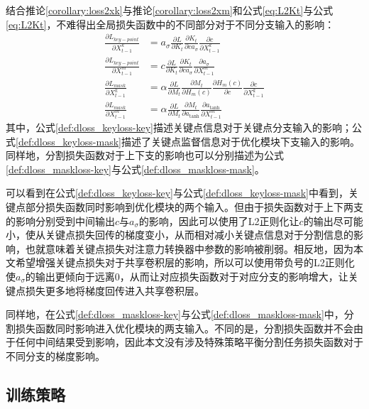 结合推论\ref{corollary:loss2xk}与推论\ref{corollary:loss2xm}和公式\eqref{eq:L2Kt}与公式\eqref{eq:L2Kt}，不难得出全局损失函数中的不同部分对于不同分支输入的影响：
\begin{align}
\frac{\partial L_{key-point}}{\partial X^k_{t-1}} &= a_{\sigma}\frac{\partial L}{\partial K_t}\frac{\partial K_t}{\partial ca_{\sigma}}\frac{\partial c}{\partial X_{t-1}^k}\label{def:dloss_keyloss-key}\\
\frac{\partial L_{key-point}}{\partial X^m_{t-1}} &= c\frac{\partial L}{\partial K_t}\frac{\partial K_t}{\partial ca_{\sigma}}\frac{\partial a_{\sigma}}{\partial X^m_{t-1}}\label{def:dloss_keyloss-mask}\\
\frac{\partial L_{mask}}{\partial X^k_{t-1}} &= \alpha\frac{\partial L}{\partial M_t}\frac{\partial M_t}{\partial H_m(c)}\frac{\partial H_m(c)}{\partial c}\frac{\partial c}{\partial X_{t-1}^k}\label{def:dloss_maskloss-key}\\
\frac{\partial L_{mask}}{\partial X^m_{t-1}} &= \alpha\frac{\partial L}{\partial M_t}\frac{\partial M_t}{\partial a_{\tanh}}\frac{\partial a_{\tanh}}{\partial X^m_{t-1}}\label{def:dloss_maskloss-mask}
\end{align}
其中，公式\eqref{def:dloss_keyloss-key}描述关键点信息对于关键点分支输入的影响；公式\eqref{def:dloss_keyloss-mask}描述了关键点监督信息对于优化模块下支输入的影响。同样地，分割损失函数对于上下支的影响也可以分别描述为公式\eqref{def:dloss_maskloss-key}与公式\eqref{def:dloss_maskloss-mask}。

可以看到在公式\eqref{def:dloss_keyloss-key}与公式\eqref{def:dloss_keyloss-mask}中看到，关键点部分损失函数同时影响到优化模块的两个输入。但由于损失函数对于上下两支的影响分别受到中间输出$c$与$a_{\sigma}$的影响，因此可以使用了L2正则化让$c$的输出尽可能小，使从关键点损失回传的梯度变小，从而相对减小关键点信息对于分割信息的影响，也就意味着关键点损失对注意力转换器中参数的影响被削弱。相反地，因为本文希望增强关键点损失对于共享卷积层的影响，所以可以使用带负号的L2正则化使$a_{\sigma}$的输出更倾向于远离0，从而让对应损失函数对于对应分支的影响增大，让关键点损失更多地将梯度回传进入共享卷积层。

同样地，在公式\eqref{def:dloss_maskloss-key}与公式\eqref{def:dloss_maskloss-mask}中，分割损失函数同时影响进入优化模块的两支输入。不同的是，分割损失函数并不会由于任何中间结果受到影响，因此本文没有涉及特殊策略平衡分割任务损失函数对于不同分支的梯度影响。


\subsection{训练策略}
\label{subsec:trainingstrategy}


